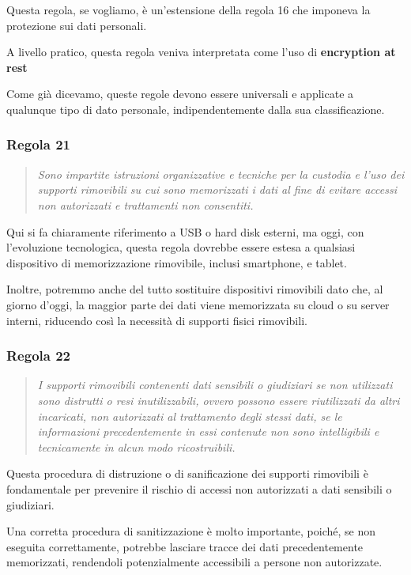 Questa regola, se vogliamo, è un'estensione della regola 16 che imponeva la protezione sui dati personali. 

A livello pratico, questa regola veniva interpretata come l'uso di \textbf{encryption at rest}

Come già dicevamo, queste regole devono essere universali e applicate a qualunque tipo di dato personale, indipendentemente dalla sua classificazione.

\subsubsection*{Regola 21}
\begin{quote}
    \textit{Sono impartite istruzioni organizzative e tecniche per la custodia e l'uso dei supporti rimovibili su cui sono memorizzati i dati al fine di evitare accessi non autorizzati e trattamenti non consentiti.}
\end{quote}

Qui si fa chiaramente riferimento a USB o hard disk esterni, ma oggi, con l'evoluzione tecnologica, questa regola dovrebbe essere estesa a qualsiasi dispositivo di memorizzazione rimovibile, inclusi smartphone, e tablet.

Inoltre, potremmo anche del tutto sostituire dispositivi rimovibili dato che, al giorno d'oggi, la maggior parte dei dati viene memorizzata su cloud o su server interni, riducendo così la necessità di supporti fisici rimovibili.

\subsubsection*{Regola 22}
\begin{quote}
    \textit{I supporti rimovibili contenenti dati sensibili o giudiziari se non utilizzati sono distrutti o resi inutilizzabili, ovvero possono essere riutilizzati da altri incaricati, non autorizzati al trattamento degli stessi dati, se le informazioni precedentemente in essi contenute non sono intelligibili e tecnicamente in alcun modo ricostruibili.}     
\end{quote}
Questa procedura di distruzione o di sanificazione dei supporti rimovibili è fondamentale per prevenire il rischio di accessi non autorizzati a dati sensibili o giudiziari. 

Una corretta procedura di sanitizzazione è molto importante, poiché, se non eseguita correttamente, potrebbe lasciare tracce dei dati precedentemente memorizzati, rendendoli potenzialmente accessibili a persone non autorizzate. 

